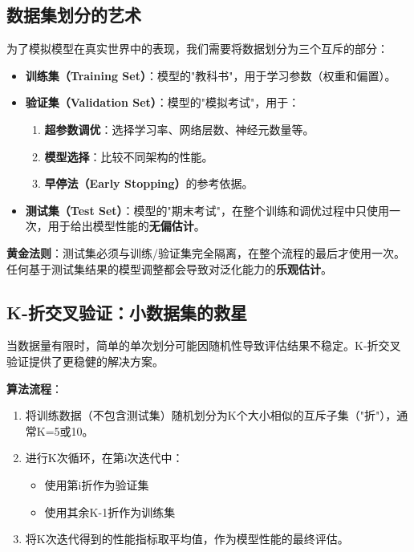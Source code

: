 \subsection{数据集划分的艺术}

为了模拟模型在真实世界中的表现，我们需要将数据划分为三个互斥的部分：
\begin{itemize}
    \item \textbf{训练集（Training Set）}：模型的"教科书"，用于学习参数（权重和偏置）。
    \item \textbf{验证集（Validation Set）}：模型的"模拟考试"，用于：
    \begin{enumerate}
        \item \textbf{超参数调优}：选择学习率、网络层数、神经元数量等。
        \item \textbf{模型选择}：比较不同架构的性能。
        \item \textbf{早停法（Early Stopping）}的参考依据。
    \end{enumerate}
    \item \textbf{测试集（Test Set）}：模型的"期末考试"，在整个训练和调优过程中只使用一次，用于给出模型性能的\textbf{无偏估计}。
\end{itemize}

\textbf{黄金法则}：测试集必须与训练/验证集完全隔离，在整个流程的最后才使用一次。任何基于测试集结果的模型调整都会导致对泛化能力的\textbf{乐观估计}。

\subsection{K-折交叉验证：小数据集的救星}

当数据量有限时，简单的单次划分可能因随机性导致评估结果不稳定。K-折交叉验证提供了更稳健的解决方案。

\textbf{算法流程}：
\begin{enumerate}
    \item 将训练数据（不包含测试集）随机划分为K个大小相似的互斥子集（"折"），通常K=5或10。
    \item 进行K次循环，在第i次迭代中：
    \begin{itemize}
        \item 使用第i折作为验证集
        \item 使用其余K-1折作为训练集
    \end{itemize}
    \item 将K次迭代得到的性能指标取平均值，作为模型性能的最终评估。
\end{enumerate}

